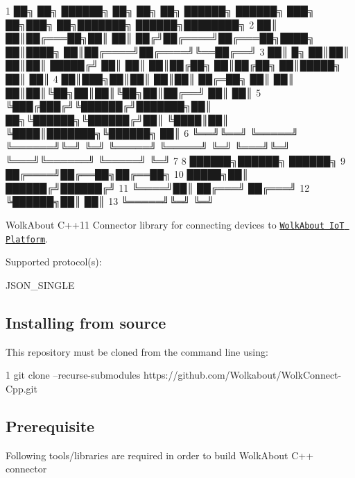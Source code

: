 
\begin{DoxyCode}
1 ██╗    ██╗ ██████╗ ██╗     ██╗  ██╗ ██████╗ ██████╗ ███╗   ██╗███╗   ██╗███████╗ ██████╗████████╗
2 ██║    ██║██╔═══██╗██║     ██║ ██╔╝██╔════╝██╔═══██╗████╗  ██║████╗  ██║██╔════╝██╔════╝╚══██╔══╝
3 ██║ █╗ ██║██║   ██║██║     █████╔╝ ██║     ██║   ██║██╔██╗ ██║██╔██╗ ██║█████╗  ██║        ██║   
4 ██║███╗██║██║   ██║██║     ██╔═██╗ ██║     ██║   ██║██║╚██╗██║██║╚██╗██║██╔══╝  ██║        ██║   
5 ╚███╔███╔╝╚██████╔╝███████╗██║  ██╗╚██████╗╚██████╔╝██║ ╚████║██║ ╚████║███████╗╚██████╗   ██║   
6  ╚══╝╚══╝  ╚═════╝ ╚══════╝╚═╝  ╚═╝ ╚═════╝ ╚═════╝ ╚═╝  ╚═══╝╚═╝  ╚═══╝╚══════╝ ╚═════╝   ╚═╝   
7 
8                                                                           ██████╗██████╗ ██████╗ 
9                                                                          ██╔════╝██╔══██╗██╔══██╗
10                                                                    █████╗██║     ██████╔╝██████╔╝
11                                                                    ╚════╝██║     ██╔═══╝ ██╔═══╝ 
12                                                                          ╚██████╗██║     ██║     
13                                                                           ╚═════╝╚═╝     ╚═╝     
\end{DoxyCode}


 Wolk\+About C++11 Connector library for connecting devices to \href{https://demo.wolkabout.com/#/login}{\tt Wolk\+About IoT Platform}.

Supported protocol(s)\+:
\begin{DoxyItemize}
\item J\+S\+O\+N\+\_\+\+S\+I\+N\+G\+LE
\end{DoxyItemize}

\subsection*{Installing from source }

This repository must be cloned from the command line using\+: 
\begin{DoxyCode}
1 git clone --recurse-submodules https://github.com/Wolkabout/WolkConnect-Cpp.git
\end{DoxyCode}


\subsection*{Prerequisite }

Following tools/libraries are required in order to build Wolk\+About C++ connector


